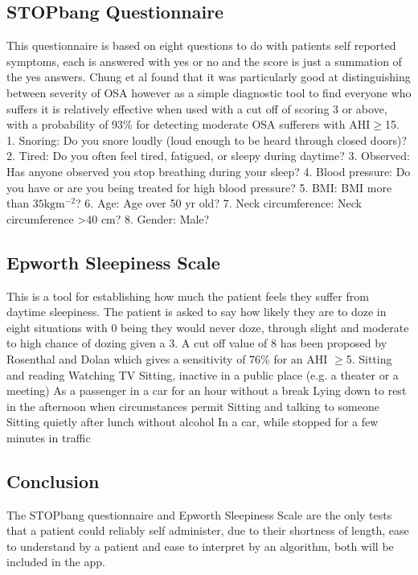 \subsection{STOPbang Questionnaire}
This questionnaire is based on eight questions to do with patients self reported symptoms, each is answered with yes or no and the score is just a summation of the yes answers. Chung et al found that it was particularly good at distinguishing between severity of OSA however as a simple diagnostic tool to find everyone who suffers it is relatively effective when used with a cut off of scoring 3 or above, with a probability of 93\% for detecting moderate OSA sufferers with AHI$\geq$15.
1. Snoring: Do you snore loudly (loud enough to be heard through closed doors)?
2. Tired: Do you often feel tired, fatigued, or sleepy during daytime?
3. Observed: Has anyone observed you stop breathing during your sleep?
4. Blood pressure: Do you have or are you being treated for high blood pressure?
5. BMI: BMI more than $35 \text{kg} \text{m}^{−2}$?
6. Age: Age over 50 yr old?
7. Neck circumference: Neck circumference >40 cm?
8. Gender: Male?

\subsection{Epworth Sleepiness Scale}
This is a tool for establishing how much the patient feels they suffer from daytime sleepiness. The patient is asked to say how likely they are to doze in eight situations with 0 being they would never doze, through slight and moderate to high chance of dozing given a 3. A cut off value of 8 has been proposed by Rosenthal and Dolan which gives a sensitivity of 76\% for an AHI $\geq$5. 
Sitting and reading
Watching TV
Sitting, inactive in a public place (e.g. a theater or a meeting)
As a passenger in a car for an hour without a break
Lying down to rest in the afternoon when circumstances permit
Sitting and talking to someone
Sitting quietly after lunch without alcohol
In a car, while stopped for a few minutes in traffic
\subsection{Conclusion}
The STOPbang questionnaire and Epworth Sleepiness Scale are the only tests that a patient could reliably self administer, due to their shortness of length, ease to understand by a patient and ease to interpret by an algorithm, both will be included in the app.
